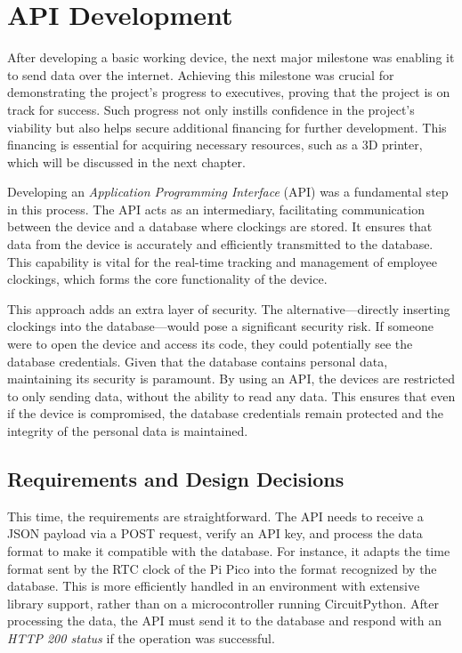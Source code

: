 \chapter{API Development}
\label{cap:apiDevelopment}

After developing a basic working device, the next major milestone was enabling it to send data 
over the internet. Achieving this milestone was crucial for demonstrating the project's 
progress to executives, proving that the project is on track for success. Such progress not only 
instills confidence in the project's viability but also helps secure additional financing for 
further development. This financing is essential for acquiring necessary resources, such as a 3D 
printer, which will be discussed in the next chapter.

Developing an \textit{Application Programming Interface} (API) was a fundamental step in this 
process. The API acts as an intermediary, facilitating communication between the device and a 
database where clockings are stored. It ensures that data from the device is accurately and 
efficiently transmitted to the database. This capability is vital for the real-time tracking and 
management of employee clockings, which forms the core functionality of the device.

This approach adds an extra layer of security. The alternative—directly inserting clockings into 
the database—would pose a significant security risk. If someone were to open the device and access 
its code, they could potentially see the database credentials. Given that the database contains 
personal data, maintaining its security is paramount. By using an API, the devices are restricted 
to only sending data, without the ability to read any data. This ensures that even if the device 
is compromised, the database credentials remain protected and the integrity of the personal data 
is maintained.


\section{Requirements and Design Decisions}

This time, the requirements are straightforward. The API needs to receive a JSON payload via a 
POST request, verify an API key, and process the data format to make it compatible with the 
database. For instance, it adapts the time format sent by the RTC clock of the Pi Pico into the 
format recognized by the database. This is more efficiently handled in an environment with 
extensive library support, rather than on a microcontroller running CircuitPython. After 
processing the data, the API must send it to the database and respond with an 
\textit{HTTP 200 status} if the operation was successful.

